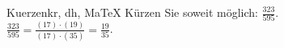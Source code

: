 \begin{MAufgabe}{Kuerzen}{kr, dh, MaTeX}
K\"urzen Sie soweit m\"oglich: $\frac{323}{595}$.\\ 
\ifLsg\MLoesung
\quad $\frac{323}{595}=\frac{(17)\cdot(19)}{(17)\cdot(35)}=\frac{19}{35}$.\else\relax\fi
 \end{MAufgabe}